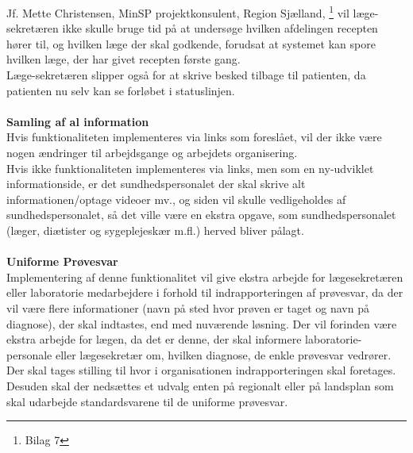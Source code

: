 Jf. Mette Christensen, MinSP projektkonsulent, Region Sjælland, \footnote{Bilag 7} vil læge-sekretæren ikke skulle bruge tid på at undersøge hvilken afdelingen recepten hører til, og hvilken læge der skal godkende, forudsat at systemet kan spore hvilken læge, der har givet recepten første gang.\\
Læge-sekretæren slipper også for at skrive besked tilbage til patienten, da patienten nu selv kan se forløbet i statuslinjen.
\\\\
\textbf{Samling af al information} \\
Hvis funktionaliteten implementeres via links som foreslået, vil der ikke være nogen ændringer til arbejdsgange og arbejdets organisering. \\
Hvis ikke funktionaliteten implementeres via links, men som en ny-udviklet informationside, er det sundhedspersonalet der skal skrive alt informationen/optage videoer mv., og siden vil skulle vedligeholdes af sundhedspersonalet, så det ville være en ekstra opgave, som sundhedspersonalet (læger, diætister og sygeplejeskær m.fl.) herved bliver pålagt.
\\\\
\textbf{Uniforme Prøvesvar} \\
Implementering af denne funktionalitet vil give ekstra arbejde for lægesekretæren eller laboratorie medarbejdere i forhold til indrapporteringen af prøvesvar, da der vil være flere informationer (navn på sted hvor prøven er taget og navn på diagnose), der skal indtastes, end med nuværende løsning. Der vil forinden være ekstra arbejde for lægen, da det er denne, der skal informere laboratorie-personale eller lægesekretær om, hvilken diagnose, de enkle prøvesvar vedrører.\\
Der skal tages stilling til hvor i organisationen indrapporteringen skal foretages. Desuden skal der nedsættes et udvalg enten på regionalt eller på landsplan som skal udarbejde standardsvarene til de uniforme prøvesvar.
